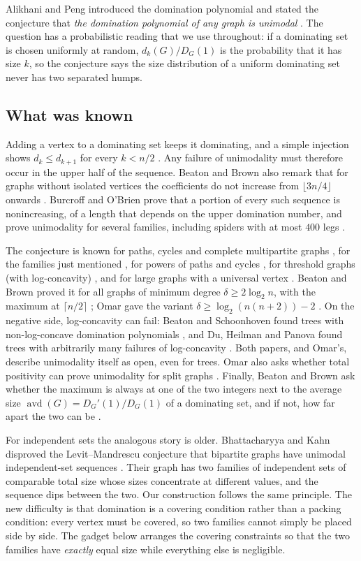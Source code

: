\documentclass[11pt,a4paper]{article}
\theoremstyle{definition}
\theoremstyle{remark}
\newcommand{\avd}{\operatorname{avd}}
\begin{document}
Alikhani and Peng introduced the domination polynomial and stated the conjecture that \emph{the domination polynomial of any graph is unimodal} \cite[p.~7]{AP}. The question has a probabilistic reading that we use throughout: if a dominating set is chosen uniformly at random, $d_k(G)/D_G(1)$ is the probability that it has size $k$, so the conjecture says the size distribution of a uniform dominating set never has two separated humps.

\subsection{What was known}
Adding a vertex to a dominating set keeps it dominating, and a simple injection shows $d_k\le d_{k+1}$ for every $k<n/2$ \cite[Proposition~2.4]{BB}. Any failure of unimodality must therefore occur in the upper half of the sequence. Beaton and Brown also remark that for graphs without isolated vertices the coefficients do not increase from $\lfloor3n/4\rfloor$ onwards \cite[Section~4]{BB}. Burcroff and O'Brien prove that a portion of every such sequence is nonincreasing, of a length that depends on the upper domination number, and prove unimodality for several families, including spiders with at most $400$ legs \cite{BO}.

The conjecture is known for paths, cycles and complete multipartite graphs \cite{BB}, for the families just mentioned \cite{BO}, for powers of paths and cycles \cite{GZ}, for threshold graphs (with log-concavity) \cite{Omar}, and for large graphs with a universal vertex \cite{Zhang}. Beaton and Brown proved it for all graphs of minimum degree $\delta\ge2\log_2 n$, with the maximum at $\lceil n/2\rceil$ \cite[Theorem~3.2]{BB}; Omar gave the variant $\delta\ge\log_2(n(n+2))-2$ \cite[Proposition~13]{Omar}. On the negative side, log-concavity can fail: Beaton and Schoonhoven found trees with non-log-concave domination polynomials \cite{BS}, and Du, Heilman and Panova found trees with arbitrarily many failures of log-concavity \cite{DHP}. Both papers, and Omar's, describe unimodality itself as open, even for trees. Omar also asks whether total positivity can prove unimodality for split graphs \cite[Section~6, question~(3)]{Omar}. Finally, Beaton and Brown ask whether the maximum is always at one of the two integers next to the average size $\avd(G)=D_G'(1)/D_G(1)$ of a dominating set, and if not, how far apart the two can be \cite[Section~4]{BB}.

For independent sets the analogous story is older. Bhattacharyya and Kahn disproved the Levit--Mandrescu conjecture that bipartite graphs have unimodal independent-set sequences \cite{BK}. Their graph has two families of independent sets of comparable total size whose sizes concentrate at different values, and the sequence dips between the two. Our construction follows the same principle. The new difficulty is that domination is a covering condition rather than a packing condition: every vertex must be covered, so two families cannot simply be placed side by side. The gadget below arranges the covering constraints so that the two families have \emph{exactly} equal size while everything else is negligible.
\end{document}
